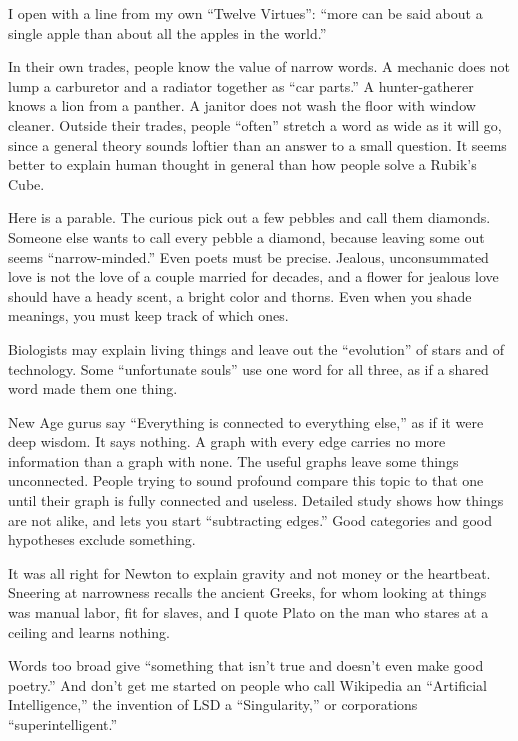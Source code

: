 
I open with a line from my own ``Twelve Virtues'': ``more can be said about a single apple than about all the apples in the world.''

In their own trades, people know the value of narrow words. A mechanic does not lump a carburetor and a radiator together as ``car parts.'' A hunter-gatherer knows a lion from a panther. A janitor does not wash the floor with window cleaner. Outside their trades, people ``often'' stretch a word as wide as it will go, since a general theory sounds loftier than an answer to a small question. It seems better to explain human thought in general than how people solve a Rubik's Cube.

Here is a parable. The curious pick out a few pebbles and call them diamonds. Someone else wants to call every pebble a diamond, because leaving some out seems ``narrow-minded.''  Even poets must be precise. Jealous, unconsummated love is not the love of a couple married for decades, and a flower for jealous love should have a heady scent, a bright color and thorns. Even when you shade meanings, you must keep track of which ones.

Biologists may explain living things and leave out the ``evolution'' of stars and of technology. Some ``unfortunate souls'' use one word for all three, as if a shared word made them one thing. 

New Age gurus say ``Everything is connected to everything else,'' as if it were deep wisdom. It says nothing. A graph with every edge carries no more information than a graph with none. The useful graphs leave some things unconnected. People trying to sound profound compare this topic to that one until their graph is fully connected and useless. Detailed study shows how things are not alike, and lets you start ``subtracting edges.'' Good categories and good hypotheses exclude something. 

It was all right for Newton to explain gravity and not money or the heartbeat.  Sneering at narrowness recalls the ancient Greeks, for whom looking at things was manual labor, fit for slaves, and I quote Plato on the man who stares at a ceiling and learns nothing. 

Words too broad give ``something that isn't true and doesn't even make good poetry.'' And don't get me started on people who call Wikipedia an ``Artificial Intelligence,'' the invention of LSD a ``Singularity,'' or corporations ``superintelligent.''
